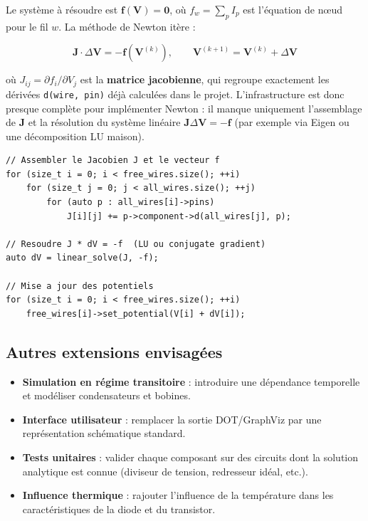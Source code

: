 \documentclass[12pt,a4paper]{article}
\begin{document}
Le système à résoudre est $\mathbf{f}(\mathbf{V}) = \mathbf{0}$, où
$f_w = \sum_p I_p$ est l'équation de nœud pour le fil $w$.
La méthode de Newton itère :

\[
  \mathbf{J} \cdot \Delta\mathbf{V} = -\mathbf{f}(\mathbf{V}^{(k)}),
  \qquad \mathbf{V}^{(k+1)} = \mathbf{V}^{(k)} + \Delta\mathbf{V}
\]

où $J_{ij} = \partial f_i / \partial V_j$ est la \textbf{matrice jacobienne},
qui regroupe exactement les dérivées \texttt{d(wire, pin)} déjà calculées dans
le projet. L'infrastructure est donc presque complète pour implémenter Newton :
il manque uniquement l'assemblage de $\mathbf{J}$ et la résolution du système
linéaire $\mathbf{J}\Delta\mathbf{V} = -\mathbf{f}$ (par exemple via Eigen ou
une décomposition LU maison).

\begin{lstlisting}[caption={Pseudo-code Newton-Raphson (non implementé)}]
// Assembler le Jacobien J et le vecteur f
for (size_t i = 0; i < free_wires.size(); ++i)
    for (size_t j = 0; j < all_wires.size(); ++j)
        for (auto p : all_wires[i]->pins)
            J[i][j] += p->component->d(all_wires[j], p);

// Resoudre J * dV = -f  (LU ou conjugate gradient)
auto dV = linear_solve(J, -f);

// Mise a jour des potentiels
for (size_t i = 0; i < free_wires.size(); ++i)
    free_wires[i]->set_potential(V[i] + dV[i]);
\end{lstlisting}

\subsection{Autres extensions envisagées}

\begin{itemize}
  \item \textbf{Simulation en régime transitoire} : introduire une dépendance
        temporelle et modéliser condensateurs et bobines.
  \item \textbf{Interface utilisateur} : remplacer la sortie DOT/GraphViz par
        une représentation schématique standard.
  \item \textbf{Tests unitaires} : valider chaque composant sur des circuits
        dont la solution analytique est connue (diviseur de tension, redresseur
        idéal, etc.).
  \item \textbf{Influence thermique} : rajouter l'influence de la température dans
  les caractéristiques de la diode et du transistor.
\end{itemize}
\end{document}

